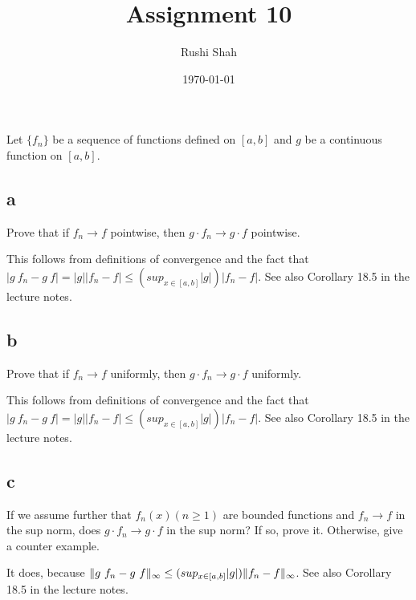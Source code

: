 \documentclass[]{article}
\author{Rushi Shah}
\date{\today}
\title{Assignment 10}
\DeclarePairedDelimiter\norm{\lVert}{\rVert}
\begin{document}
	\maketitle

	\section{}
		\begin{em}
			Let $\{f_n\}$ be a sequence of functions defined on $[a, b]$ and $g$ be a continuous function on $[a, b]$. 
		\end{em}

		\subsection*{a}
		\begin{em}
			Prove that if $f_n \to f$ pointwise, then $g \cdot f_n \to g \cdot f$ pointwise. 
		\end{em}

			This follows from definitions of convergence and the fact that $|g\ f_n − g\ f| = |g||f_n − f| \leq (sup_{x \in [a,b]} |g|)|f_n − f|$. See also Corollary 18.5 in the lecture notes. 

		\subsection*{b}
			\begin{em}
				Prove that if $f_n \to f$ uniformly, then $g \cdot f_n \to g \cdot f$ uniformly.
			\end{em}

			This follows from definitions of convergence and the fact that $|g\ f_n − g\ f| = |g||f_n − f| \leq (sup_{x \in [a,b]} |g|)|f_n − f|$. See also Corollary 18.5 in the lecture notes. 

		\subsection*{c}
			\begin{em}
				If we assume further that $f_n(x) (n \geq 1)$ are bounded functions and $f_n \to f$ in the sup norm, does $g \cdot f_n \to g \cdot f$ in the sup norm? If so, prove it. Otherwise, give a counter example.
			\end{em}

			It does, because $\norm{g\ f_n - g\ f}_\infty \leq (sup_{x \in [a, b]}|g|) \norm{f_n - f}_\infty$. See also Corollary 18.5 in the lecture notes. 
\end{document}
